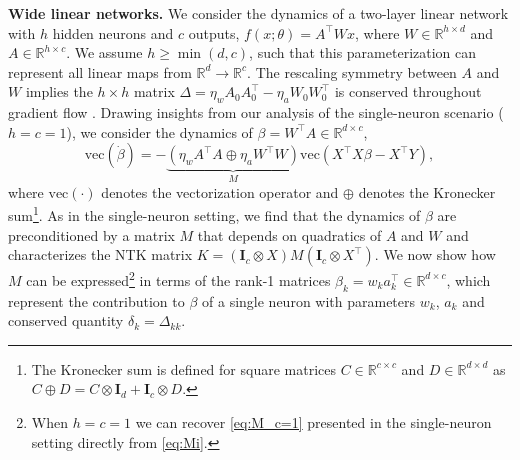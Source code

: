 \documentclass{article}
\theoremstyle{plain}
\theoremstyle{definition}
\theoremstyle{remark}
\begin{document}
\textbf{Wide linear networks.}
%
We consider the dynamics of a two-layer linear network with $h$ hidden neurons and $c$ outputs, $f(x;\theta) = A^\intercal W x$, where $W \in \mathbb{R}^{h \times d}$ and $A \in \mathbb{R}^{h \times c}$.
%
We assume $h \ge \min(d,c)$, such that this parameterization can represent all linear maps from $\mathbb{R}^d \to \mathbb{R}^c$.
%
The rescaling symmetry between $A$ and $W$ implies the $h \times h$ matrix $\Delta =  \eta_wA_0A_0^\intercal - \eta_aW_0W_0^\intercal$ is conserved throughout gradient flow \cite{du2018algorithmic}.
%
Drawing insights from our analysis of the single-neuron scenario ($h = c = 1$), 
%
we consider the dynamics of $\beta = W^\intercal A \in \mathbb{R}^{d \times c}$,
\begin{equation}
    \mathrm{vec}\left(\dot{\beta}\right) = -\underbrace{\left(\eta_wA^{\intercal}A \oplus \eta_aW^{\intercal}W\right)}_{M} \mathrm{vec}(X^\intercal X\beta - X^\intercal Y),
\end{equation}
where $\mathrm{vec}(\cdot)$ denotes the vectorization operator and $\oplus$ denotes the Kronecker sum\footnote{The Kronecker sum is defined for square matrices $C \in \mathbb{R}^{c \times c}$ and $D \in \mathbb{R}^{d \times d}$ as $C \oplus D = C \otimes \mathbf{I}_{d} + \mathbf{I}_{c} \otimes D$.}.
%
As in the single-neuron setting, we find that the dynamics of $\beta$ are preconditioned by a matrix $M$ that depends on quadratics of $A$ and $W$ and characterizes the NTK matrix $K = \left(\mathbf{I}_{c} \otimes X\right)M\left(\mathbf{I}_{c} \otimes X^\intercal\right)$.
%
We now show how $M$ can be expressed\footnote{When $h = c = 1$ we can recover \cref{eq:M_c=1} presented in the single-neuron setting directly from \cref{eq:Mi}.} in terms of the rank-1 matrices $\beta_k = w_ka_k^\intercal \in \mathbb{R}^{d \times c}$, which represent the contribution to $\beta$ of a single neuron with parameters $w_k$, $a_k$ and conserved quantity $\delta_k = \Delta_{kk}$.
%
% 
\end{document}
